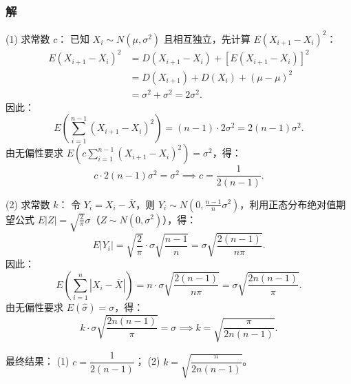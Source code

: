 \documentclass{book}
\begin{document}
\subsubsection{解}
(1) 求常数 $c$：
已知 $X_i \sim N(\mu, \sigma^2)$ 且相互独立，先计算 $E(X_{i+1}-X_i)^2$：
\[
\begin{aligned}
E(X_{i+1}-X_i)^2 &= D(X_{i+1}-X_i) + [E(X_{i+1}-X_i)]^2 \\
&= D(X_{i+1}) + D(X_i) + (\mu - \mu)^2 \\
&= \sigma^2 + \sigma^2 = 2\sigma^2.
\end{aligned}
\]
因此：
\[
E\left(\sum_{i=1}^{n-1} (X_{i+1}-X_i)^2\right) = (n-1) \cdot 2\sigma^2 = 2(n-1)\sigma^2.
\]
由无偏性要求 $E\left(c\sum_{i=1}^{n-1} (X_{i+1}-X_i)^2\right) = \sigma^2$，得：
\[
c \cdot 2(n-1)\sigma^2 = \sigma^2 \implies c = \frac{1}{2(n-1)}.
\]

(2) 求常数 $k$：
令 $Y_i = X_i - \overline{X}$，则 $Y_i \sim N\left(0, \frac{n-1}{n}\sigma^2\right)$，利用正态分布绝对值期望公式 $E|Z| = \sqrt{\frac{2}{\pi}}\sigma$（$Z \sim N(0,\sigma^2)$），得：
\[
E|Y_i| = \sqrt{\frac{2}{\pi}} \cdot \sigma \sqrt{\frac{n-1}{n}} = \sigma \sqrt{\frac{2(n-1)}{n\pi}}.
\]
因此：
\[
E\left(\sum_{i=1}^n |X_i - \overline{X}|\right) = n \cdot \sigma \sqrt{\frac{2(n-1)}{n\pi}} = \sigma \sqrt{\frac{2n(n-1)}{\pi}}.
\]
由无偏性要求 $E(\hat{\sigma}) = \sigma$，得：
\[
k \cdot \sigma \sqrt{\frac{2n(n-1)}{\pi}} = \sigma \implies k = \sqrt{\frac{\pi}{2n(n-1)}}.
\]

最终结果：
(1) $\boxed{c = \dfrac{1}{2(n-1)}}$；
(2) $\boxed{k = \sqrt{\dfrac{\pi}{2n(n-1)}}}$。
\end{document}
